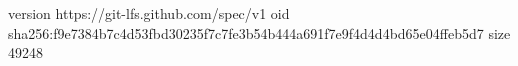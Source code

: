 version https://git-lfs.github.com/spec/v1
oid sha256:f9e7384b7c4d53fbd30235f7c7fe3b54b444a691f7e9f4d4d4bd65e04ffeb5d7
size 49248
